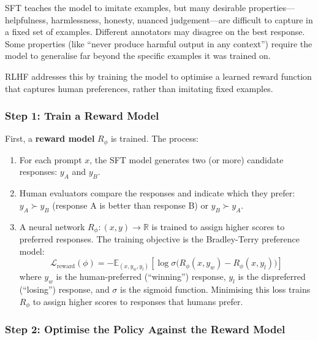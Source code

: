 \documentclass[11pt, a4paper]{article}
\begin{document}
SFT teaches the model to imitate examples, but many desirable properties---helpfulness, harmlessness, honesty, nuanced judgement---are difficult to capture in a fixed set of examples. Different annotators may disagree on the best response. Some properties (like ``never produce harmful output in any context'') require the model to generalise far beyond the specific examples it was trained on.

RLHF addresses this by training the model to optimise a learned reward function that captures human preferences, rather than imitating fixed examples.

\subsubsection{Step 1: Train a Reward Model}

First, a \textbf{reward model} $R_\phi$ is trained. The process:
\begin{enumerate}
  \item For each prompt $x$, the SFT model generates two (or more) candidate responses: $y_A$ and $y_B$.
  \item Human evaluators compare the responses and indicate which they prefer: $y_A \succ y_B$ (response A is better than response B) or $y_B \succ y_A$.
  \item A neural network $R_\phi: (x, y) \to \mathbb{R}$ is trained to assign higher scores to preferred responses. The training objective is the Bradley-Terry preference model:
  \[
    \mathcal{L}_{\text{reward}}(\phi) = -\mathbb{E}_{(x, y_w, y_l)} \left[ \log \sigma\!\bigl(R_\phi(x, y_w) - R_\phi(x, y_l)\bigr) \right]
  \]
  where $y_w$ is the human-preferred (``winning'') response, $y_l$ is the dispreferred (``losing'') response, and $\sigma$ is the sigmoid function. Minimising this loss trains $R_\phi$ to assign higher scores to responses that humans prefer.
\end{enumerate}

\subsubsection{Step 2: Optimise the Policy Against the Reward Model}
\end{document}
